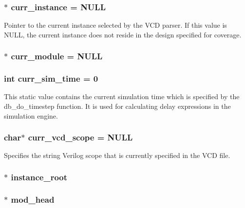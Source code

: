 \subsubsection{$\ast$ curr\_\-instance = NULL}\label{db_8c_a3}


Pointer to the current instance selected by the VCD parser. If this value is NULL, the current instance does not reside in the design specified for coverage. 
\subsubsection{$\ast$ curr\_\-module = NULL}\label{db_8c_a8}


\subsubsection{\setlength{\rightskip}{0pt plus 5cm}int curr\_\-sim\_\-time = 0}\label{db_8c_a13}


This static value contains the current simulation time which is specified by the db\_\-do\_\-timestep function. It is used for calculating delay expressions in the simulation engine. 
\subsubsection{\setlength{\rightskip}{0pt plus 5cm}char$\ast$ curr\_\-vcd\_\-scope = NULL}\label{db_8c_a2}


Specifies the string Verilog scope that is currently specified in the VCD file. 
\subsubsection{$\ast$ instance\_\-root}\label{db_8c_a1}


\subsubsection{$\ast$ mod\_\-head}\label{db_8c_a4}



